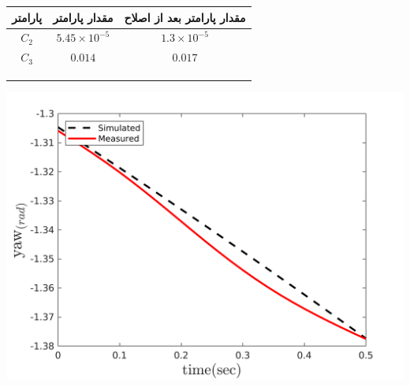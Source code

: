 \begin{minipage}[H]{\linewidth}
	\hfill
	\begin{minipage}[b]{0.49\linewidth}
		\centering
		\begin{tabular}{ccc}\hline
			پارامتر & مقدار پارامتر  & مقدار پارامتر بعد از اصلاح
			\\ \hline
			$C_2$  & $5.45\times10^{-5}$ & $1.3\times10^{-5}$ \\
			$C_3$  & $0.014$ & $0.017$ \\
			\\\\\\
		\end{tabular}
	\end{minipage}
	\begin{minipage}[b]{0.48\linewidth}
		\centering
		\includegraphics[width=1\linewidth]{../Figures/RCP/yaw_parameter_estimation/RCP_yaw_S2.png}
	\end{minipage}
\end{minipage}
